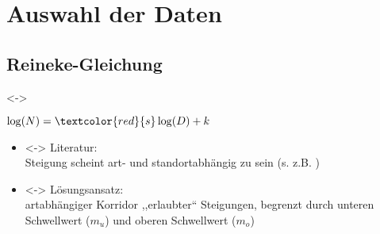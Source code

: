 \section{Auswahl der Daten}
\subsection{Reineke-Gleichung}
\begin{frame}[c]
  \visible<\theFirstElement->{
    \begin{center}
      \begin{minipage}{0.40\textwidth}
        \centerline{\(\mylog(N) = \textcolor{red}{s} \log(D) + k\)}
        \vspace{\captiondistance}
      \end{minipage}
    \end{center}

  }

  \begin{itemize}
  \item<\theSecondElement-> Literatur: \\
    Steigung scheint art- und standortabhängig zu sein (s. z.B. \VospernikSterba{})
  \item<\theSecondElement-> Lösungsansatz: \\
    artabhängiger Korridor ,,erlaubter`` Steigungen, begrenzt durch unteren Schwellwert (\(m_u\)) und oberen Schwellwert (\(m_o\))
  \end{itemize}
\end{frame}

